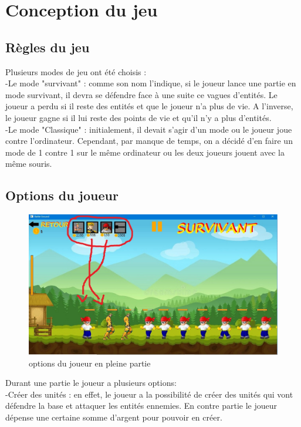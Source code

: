 \documentclass[a4paper,11pt]{article}
\begin{document}
\section {Conception du jeu}
\subsection {Règles du jeu}

Plusieurs modes de jeu ont été choisis :\\
-Le mode "survivant" : comme son nom l'indique, si le joueur lance une partie en mode survivant, il devra se défendre face à une suite ce vagues
d'entités. Le joueur a perdu si il reste des entités et que le joueur n'a plus de vie. A l'inverse, le joueur gagne si il lui reste des 
points de vie et qu'il n'y a plus d'entités.\\
-Le mode "Classique" : initialement, il devait s'agir d'un mode ou le joueur joue contre l'ordinateur. Cependant, par manque de temps, on a décidé 
d'en faire un mode de 1 contre 1 sur le même ordinateur ou les deux joueurs jouent avec la même souris.\\

\subsection {Options du joueur}
\begin{figure}[h!]
\centering
\includegraphics [width=1\textwidth]{image9.jpg} 
\caption {\label{image} options du joueur en pleine partie}
\end{figure}
 \smallbreak
Durant une partie le joueur a plusieurs options:\\
-Créer des unités : en effet, le joueur a la possibilité de créer des unités qui vont défendre la base et attaquer les entités ennemies.
En contre partie le joueur dépense une certaine somme d'argent pour pouvoir en créer.\\
\end{document}

